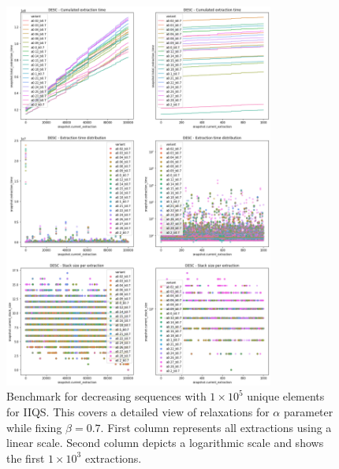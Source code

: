 \begin{figure}[p]
    \centering
    \includegraphics[width=0.79\textwidth]{./fragments/04_experimental_execution/images/04_alphabeta_detail_decreasing_left.png}
    \caption{Benchmark for decreasing sequences with $1\times10^5$ unique elements for IIQS. This covers a detailed view of relaxations for $\alpha$ parameter while fixing $\beta=0.7$. First column represents all extractions using a linear scale. Second column depicts a logarithmic scale and shows the first $1\times10^3$ extractions. }
    \label{FIG:05_ALPHABETA_BENCHMARK_DESC_LEFT}
\end{figure}

